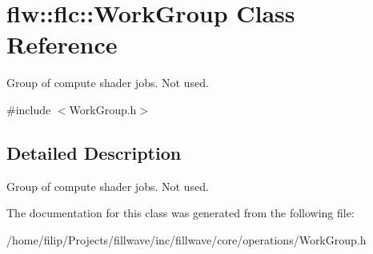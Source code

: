 \hypertarget{classflw_1_1flc_1_1WorkGroup}{}\section{flw\+:\+:flc\+:\+:Work\+Group Class Reference}
\label{classflw_1_1flc_1_1WorkGroup}


Group of compute shader jobs. Not used.  




{\ttfamily \#include $<$Work\+Group.\+h$>$}



\subsection{Detailed Description}
Group of compute shader jobs. Not used. 

The documentation for this class was generated from the following file\+:\begin{DoxyCompactItemize}
\item 
/home/filip/\+Projects/fillwave/inc/fillwave/core/operations/Work\+Group.\+h\end{DoxyCompactItemize}
